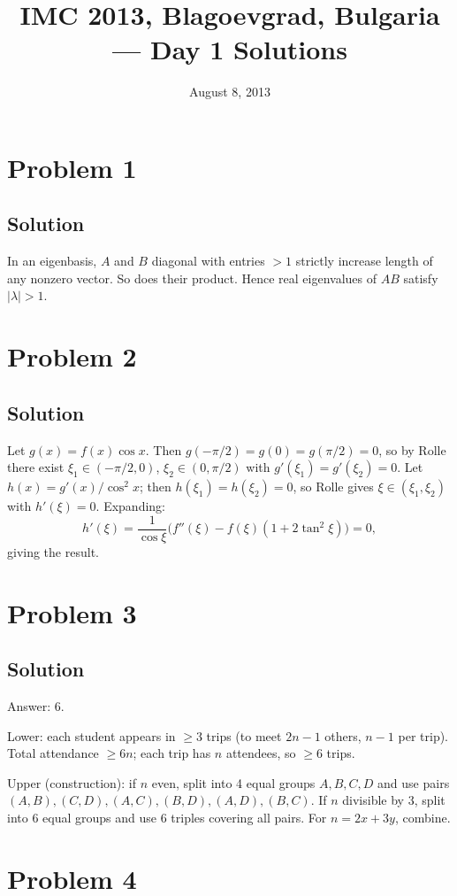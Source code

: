 \documentclass{article}
\title{IMC 2013, Blagoevgrad, Bulgaria --- Day 1 Solutions}
\date{August 8, 2013}
\begin{document}
\maketitle

\section*{Problem 1}
\subsection*{Solution}
In an eigenbasis, $A$ and $B$ diagonal with entries $> 1$ strictly increase length of any nonzero vector. So does their product. Hence real eigenvalues of $AB$ satisfy $|\lambda| > 1$.

\section*{Problem 2}
\subsection*{Solution}
Let $g(x) = f(x) \cos x$. Then $g(-\pi/2) = g(0) = g(\pi/2) = 0$, so by Rolle there exist $\xi_1 \in (-\pi/2, 0)$, $\xi_2 \in (0, \pi/2)$ with $g'(\xi_1) = g'(\xi_2) = 0$. Let $h(x) = g'(x)/\cos^2 x$; then $h(\xi_1) = h(\xi_2) = 0$, so Rolle gives $\xi \in (\xi_1, \xi_2)$ with $h'(\xi) = 0$. Expanding:
\[ h'(\xi) = \frac{1}{\cos\xi}\big(f''(\xi) - f(\xi)(1 + 2\tan^2\xi)\big) = 0, \]
giving the result.

\section*{Problem 3}
\subsection*{Solution}
Answer: $6$.

Lower: each student appears in $\ge 3$ trips (to meet $2n-1$ others, $n-1$ per trip). Total attendance $\ge 6n$; each trip has $n$ attendees, so $\ge 6$ trips.

Upper (construction): if $n$ even, split into 4 equal groups $A,B,C,D$ and use pairs $(A,B), (C,D), (A,C), (B,D), (A,D), (B,C)$. If $n$ divisible by 3, split into 6 equal groups and use 6 triples covering all pairs. For $n = 2x + 3y$, combine.

\section*{Problem 4}
\end{document}
